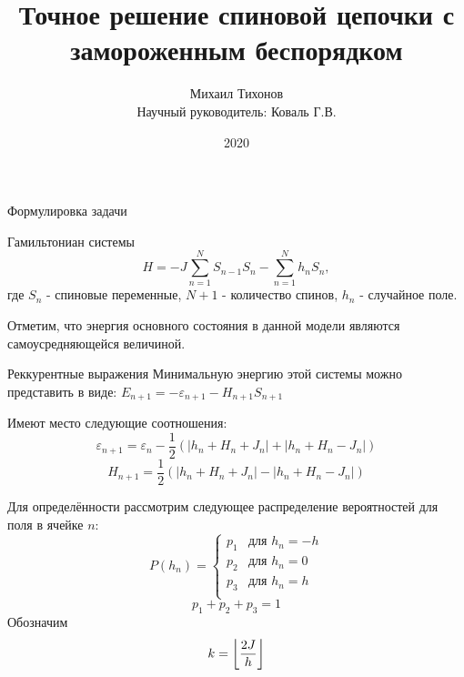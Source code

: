 \documentclass{beamer}
\title{Точное решение спиновой цепочки с замороженным беспорядком}
\author[Михаил Тихонов]{Михаил Тихонов\\{\scriptsize  Научный руководитель: Коваль Г.В.}}
\institute[Московский государственный университет им. М.В. Ломоносова]
\date{2020}
\DeclarePairedDelimiter\floor{\lfloor}{\rfloor}
\begin{document}
\begin{frame}
  \titlepage
\end{frame}


\begin{frame}{Формулировка задачи}
    \begin{block}{Гамильтониан системы}
    \begin{equation*}
        H = -J \sum_{n=1}^N S_{n-1} S_n - \sum_{n=1}^N h_n S_n,
    \end{equation*}
    где $S_n$ - спиновые переменные, $N+1$ - количество спинов, $h_n$ - случайное поле.
     \end{block}
    Отметим, что энергия основного состояния в данной модели являются самоусредняющейся величиной.
\end{frame}

\begin{frame}{Реккурентные выражения}
Минимальную энергию этой системы можно представить в виде: $
E_{n+1} = - \varepsilon_{n+1} - H_{n+1} S_{n+1}$
\pause
\begin{block}{Имеют место следующие соотношения:}
	\begin{equation*}
	\varepsilon_{n+1} = \varepsilon_n - \frac{1} 2 \left(|h_n + H_n + J_n| + |h_n+H_n - J_n| \right)
	\end{equation*}
	\begin{equation*}
	H_{n+1} = \frac{1}{2} \left(|h_n + H_n + J_n| - |h_n + H_n - J_n| \right)
	\end{equation*}
\end{block}
\end{frame}



\begin{frame}
Для определённости рассмотрим следующее распределение вероятностей для поля в ячейке $n$:
\begin{equation*}
P(h_n) =
\begin{cases}
p_1 &\mbox{для } h_n= -h \\
p_2 &\mbox{для } h_n= 0 \\
p_3 &\mbox{для } h_n= h\\
\end{cases}
\end{equation*}
\begin{equation*}
p_1+p_2+p_3 = 1
\end{equation*}
Обозначим
	\begin{equation*}
	k = \floor*{ \frac{2J}{h}}
	\end{equation*}

\end{frame}
\end{document}
